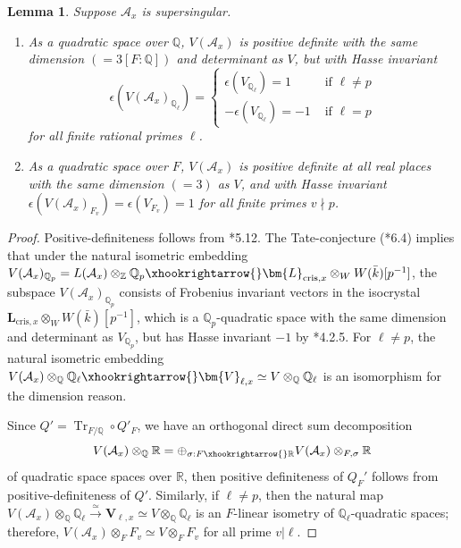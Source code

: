 \documentclass{amsart}
\numberwithin{equation}{subsection}
\numberwithin{theorem}{section}
\newtheorem{lemma}[theorem]{Lemma}
\theoremstyle{definition}
\theoremstyle{remark}
\newcommand{\bQ}{\mathbb{Q}}
\newcommand{\bR}{\mathbb{R}}
\newcommand{\bZ}{\mathbb{Z}}
\newcommand{\cA}{\mathcal{A}}
\DeclareMathOperator{\Tr}{Tr}
\begin{document}
\begin{lemma} \label{lem:specialend}
    Suppose $\cA_x$ is supersingular. 
    \begin{enumerate}
        \item As a quadratic space over $\bQ$, $V(\cA_x)$ is positive definite with the same dimension $(= 3[F:\bQ])$ and determinant as $V$, but with Hasse invariant \[\epsilon(V(\cA_x)_{\bQ_\ell}) = \begin{cases}\epsilon(V_{\bQ_\ell}) = 1 & \text{ if }\ell\neq p \\ -\epsilon(V_{\bQ_\ell}) = -1 & \text{ if }\ell= p\end{cases}\] for all finite rational primes $\ell$. 
        \item As a quadratic space over $F$, $V(\cA_x)$ is positive definite at all real places with the same dimension $(=3)$ as $V$, and with Hasse invariant $\epsilon(V(\cA_x)_{F_v}) = \epsilon(V_{F_v}) = 1 $ for all finite primes $v\nmid p$.
    \end{enumerate}
\end{lemma}
\begin{proof}
    Positive-definiteness follows from \cite{MR3484114}*{5.12}. 
    The Tate-conjecture (\cite{MR3370622}*{6.4}) implies that under the natural isometric embedding $V(\cA_x)_{\bQ_p} = L(\cA_x)\otimes_{\bZ} \bQ_p \xhookrightarrow{} \bm{L}_{\mathrm{cris}, x}\otimes_W W(\bar{k})[p^{-1}]$,   the subspace $V(\cA_x)_{\bQ_p}$ consists of Frobenius invariant vectors in the isocrystal $\bm{L}_{\mathrm{cris}, x}\otimes_W W(\bar{k})[p^{-1}]$, which is a $\bQ_p$-quadratic space with the same dimension and determinant as $V_{\bQ_p}$, but has Hasse invariant $-1$ by \cite{MR3705249}*{4.2.5}. For $\ell\neq p$, the natural isometric embedding $V(\mathcal{A}_x) \otimes_\bQ \bQ_\ell \xhookrightarrow{} \bm{V}_{\ell,x} \simeq V\otimes_{\bQ}\bQ_\ell$ is an isomorphism for the dimension reason. 

    Since $Q' = \Tr_{F/\bQ} \circ Q'_F$, we have an orthogonal direct sum decomposition \[V(\cA_x)\otimes_{\bQ} \bR = \oplus_{\sigma:F\xhookrightarrow{}\bR} V(\cA_x)\otimes_{F, \sigma} \bR\] of quadratic space spaces over $\bR$, then positive definiteness of $ Q_F'$ follows from positive-definiteness of $Q'$. Similarly, if $\ell\neq p$, then the natural map $V(\cA_x)\otimes_{\bQ}\bQ_\ell \xrightarrow{\simeq} \bm{V}_{\ell,x} \simeq V\otimes_{\bQ}\bQ_\ell$ is an $F$-linear isometry of $\bQ_\ell$-quadratic spaces; therefore, $V(\cA_x)\otimes_{F} F_v \simeq V\otimes_{F} F_v$ for all prime $v|\ell$. 
\end{proof}
\end{document}
